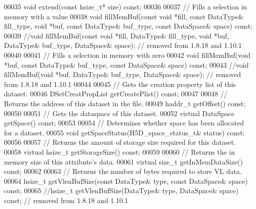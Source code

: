\begin{DoxyCode}
00035         \textcolor{keywordtype}{void} extend(\textcolor{keyword}{const} hsize\_t* size) \textcolor{keyword}{const};
00036 
00037         \textcolor{comment}{// Fills a selection in memory with a value}
00038         \textcolor{keywordtype}{void} fillMemBuf(\textcolor{keyword}{const} \textcolor{keywordtype}{void} *fill, \textcolor{keyword}{const} DataType& fill\_type, \textcolor{keywordtype}{void} *buf, \textcolor{keyword}{const} DataType& buf\_type, \textcolor{keyword}{
      const} DataSpace& space) \textcolor{keyword}{const};
00039         \textcolor{comment}{//void fillMemBuf(const void *fill, DataType& fill\_type, void *buf, DataType& buf\_type, DataSpace&
       space); // removed from 1.8.18 and 1.10.1}
00040 
00041         \textcolor{comment}{// Fills a selection in memory with zero}
00042         \textcolor{keywordtype}{void} fillMemBuf(\textcolor{keywordtype}{void} *buf, \textcolor{keyword}{const} DataType& buf\_type, \textcolor{keyword}{const} DataSpace& space) \textcolor{keyword}{const};
00043         \textcolor{comment}{//void fillMemBuf(void *buf, DataType& buf\_type, DataSpace& space); // removed from 1.8.18 and
       1.10.1}
00044 
00045         \textcolor{comment}{// Gets the creation property list of this dataset.}
00046         DSetCreatPropList getCreatePlist() \textcolor{keyword}{const};
00047 
00048         \textcolor{comment}{// Returns the address of this dataset in the file.}
00049         haddr\_t getOffset() \textcolor{keyword}{const};
00050 
00051         \textcolor{comment}{// Gets the dataspace of this dataset.}
00052         \textcolor{keyword}{virtual} DataSpace getSpace() \textcolor{keyword}{const};
00053 
00054         \textcolor{comment}{// Determines whether space has been allocated for a dataset.}
00055         \textcolor{keywordtype}{void} getSpaceStatus(H5D\_space\_status\_t& status) \textcolor{keyword}{const};
00056 
00057         \textcolor{comment}{// Returns the amount of storage size required for this dataset.}
00058         \textcolor{keyword}{virtual} hsize\_t getStorageSize() \textcolor{keyword}{const};
00059 
00060         \textcolor{comment}{// Returns the in memory size of this attribute's data.}
00061         \textcolor{keyword}{virtual} \textcolor{keywordtype}{size\_t} getInMemDataSize() \textcolor{keyword}{const};
00062 
00063         \textcolor{comment}{// Returns the number of bytes required to store VL data.}
00064         hsize\_t getVlenBufSize(\textcolor{keyword}{const} DataType& type, \textcolor{keyword}{const} DataSpace& space) \textcolor{keyword}{const};
00065         \textcolor{comment}{//hsize\_t getVlenBufSize(DataType& type, DataSpace& space) const; // removed from 1.8.18 and 1.10.1}

\end{DoxyCode}
